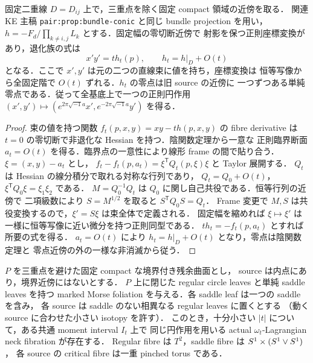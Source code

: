 \begin{lemma}
\label{ke:projected-source-normal-form}
固定二重線 $D=D_{ij}$ 上で，三重点を除く固定 compact 領域の近傍を取る．
関連 KE 主稿 \texttt{pair:prop:bundle-conic} と同じ bundle projection を用い，
$h=-F_d/\prod_{k\ne i,j}L_k$ とする．固定幅の零切断近傍で
射影を保つ正則座標変換があり，退化族の式は
\[
 x'y'=t h_t(p),\qquad h_t=h|_D+O(t)
\]
となる．ここで $x',y'$ は元の二つの直線束に値を持ち，座標変換は
恒等写像から全固定階で $O(t)$ ずれる．$h_t$ の零点は旧 source の近傍に
一つずつある単純零点である．従って全基底上で一つの正則円作用
$(x',y')\mapsto(e^{2\pi\sqrt{-1}a}x',e^{-2\pi\sqrt{-1}a}y')$ を得る．
\end{lemma}

\begin{proof}
束の値を持つ関数 $f_t(p,x,y)=xy-th(p,x,y)$ の fibre derivative は
$t=0$ の零切断で非退化な Hessian を持つ．陰関数定理から一意な
正則臨界断面 $a_t=O(t)$ を得る．臨界点の一意性により線形 frame の間で貼り合う．
$\xi=(x,y)-a_t$ とし，
$f_t-f_t(p,a_t)=\xi^{\mathsf T} Q_t(p,\xi)\xi$ と Taylor 展開する．
$Q_t$ は Hessian の線分積分で取れる対称な行列であり，
$Q_t=Q_0+O(t)$，$\xi^{\mathsf T}Q_0\xi=\xi_1\xi_2$ である．
$M=Q_0^{-1}Q_t$ は $Q_0$ に関し自己共役である．恒等行列の近傍で
二項級数により $S=M^{1/2}$ を取ると $S^{\mathsf T}Q_0 S=Q_t$．
Frame 変更で $M,S$ は共役変換するので，$\xi'=S\xi$ は束全体で定義される．
固定幅を縮めれば $\xi\mapsto\xi'$ は一様に恒等写像に近い微分を持つ正則同型である．
$t h_t=-f_t(p,a_t)$ とすれば所要の式を得る．
$a_t=O(t)$ により $h_t=h|_D+O(t)$ となり，零点は陰関数定理と
零点近傍の外の一様な非消滅から従う．
\end{proof}

\begin{theorem}
\label{ke:projected-source-neck}
$P$ を三重点を避けた固定 compact な境界付き残余曲面とし，
source は内点にあり，境界近傍にはないとする．
$P$ 上に閉じた regular circle leaves と単純 saddle leaves を持つ
marked Morse foliation を与える．各 saddle leaf は一つの saddle を含み，
各 source は saddle のない相異なる regular leaves に置くとする
（動く source に合わせた小さい isotopy を許す）．
このとき，十分小さい $|t|$ について，ある共通 moment interval $I_t$ 上で
同じ円作用を用いる actual $\omega_t$-Lagrangian neck fibration が存在する．
Regular fibre は $T^2$，saddle fibre は $S^1\times(S^1\vee S^1)$，
各 source の critical fibre は一重 pinched torus である．
\end{theorem}

